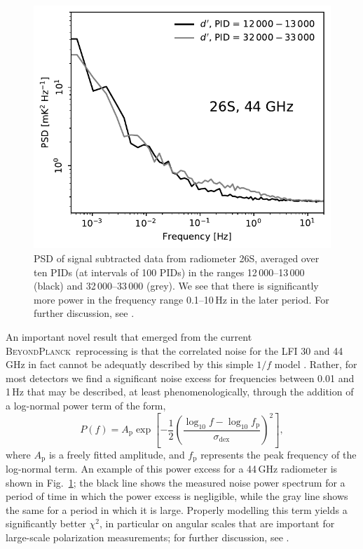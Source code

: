 \documentclass[twocolumn]{aa}
\newcommand{\BP}{\textsc{BeyondPlanck}}
\begin{document}
\begin{figure}
        \begin{center}
                \includegraphics[width=\linewidth]{figs/ps_running_mean_26S.pdf}
        \end{center}
        \caption{PSD of signal subtracted data from radiometer 26S, averaged over ten PIDs (at intervals of 100 PIDs) in the ranges 
    12\,000--13\,000 (black) and 32\,000--33\,000 (grey). We see that there is
    significantly more power in the frequency range 0.1--10\,Hz in the
    later period. For further discussion, see \citet{bp06}.
                \label{fig:ps_compare_26S}}
\end{figure}

An important novel result that emerged from the current
\BP\ reprocessing is that the correlated noise for the LFI 30 and
44\,GHz in fact cannot be adequatly described by this simple $1/f$
model \citep{bp06}. Rather, for most detectors we find a significant
noise excess for frequencies between 0.01 and 1\,Hz that may
be described, at least phenomenologically, through the addition of a
log-normal power term of the form,
\begin{equation}
  P(f) = A_\mathrm{p}
    \exp\left[-\frac{1}{2}\left(\frac{\log_{10}f - \log_{10} f_\mathrm{p}}{\sigma_\mathrm{dex}}\right)^2\right],
    \label{eq:1fmodel_lognorm}
\end{equation} 
where $A_{\mathrm{p}}$ is a freely fitted amplitude, and
$f_\mathrm{p}$ represents the peak frequency of the log-normal
term. An example of this power excess for a 44\,GHz radiometer is
shown in Fig.~\ref{fig:ps_compare_26S}; the black line shows the
measured noise power spectrum for a period of time in which the power
excess is negligible, while the gray line shows the same for a period
in which it is large. Properly modelling this term yields a
significantly better $\chi^2$, in particular on angular scales that
are important for large-scale polarization measurements; for further
discussion, see \citet{bp06}.
\end{document}
